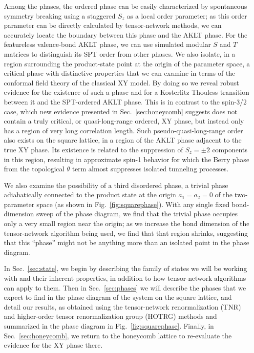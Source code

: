 \documentclass[aps,prb,letterpaper,superscriptaddress,twocolumn,showpacs,floatfix,10pt]{revtex4-1}
\begin{document}
Among the phases, the ordered phase can be easily characterized by spontaneous
symmetry breaking using a staggered $S_z$ as a local order parameter; as this
order parameter can be directly calculated by tensor-network methods,
we can accurately locate the boundary between this phase and the
AKLT phase. For the featureless valence-bond AKLT phase,
we can use simulated modular $S$ and $T$ matrices to distinguish its SPT order
from other phases.\cite{tnST,LevinGuSPT,HungWenSPT}
We also isolate, in a region surrounding the product-state
point at the origin of the parameter space, a critical phase with distinctive
properties that we can examine in terms of the conformal field theory of the
classical XY model.  By doing so we reveal
robust evidence for the existence of such a phase and for a Kosterlitz-Thouless
transition between it and the SPT-ordered AKLT phase. This is in contrast to
the spin-3/2 case\cite{AKLTspin32}, which new evidence
 presented in Sec.~\ref{sec:honeycomb}
suggests does not contain a truly critical, or quasi-long-range ordered,
XY phase, but instead only has a region of
very long correlation length. Such pseudo-quasi-long-range order also exists on
the square lattice, in a region of the AKLT phase adjacent to the
true XY phase.  Its existence is related to the suppression of $S_z=\pm 2$
components in this region, resulting in approximate spin-1
behavior for which the Berry
phase from the topological $\theta$ term almost suppresses isolated
tunneling processes.\cite{Haldane2D}

We  also examine the possibility of a third disordered phase, a trivial phase
adiabatically connected to the product state at the origin
$a_1=a_2=0$ of the two-parameter
space (as shown in  Fig.~\ref{fig:squarephase}). With any single fixed bond-dimension sweep of the phase diagram,
we find that the trivial phase occupies only a very small region near the
origin; as we increase the bond dimension of the tensor-network
algorithm being used, we find that that region shrinks,
suggesting that this ``phase'' might not be anything more than an
isolated point in the phase diagram.

In Sec.~\ref{sec:state}, we begin by describing the family of states we will
be working with and their inherent properties, in addition to how
tensor-network algorithms can apply to them.
Then in Sec.~\ref{sec:phases} we will describe the phases that
we expect to find in the phase diagram of the system on the square
lattice, and detail our results, as obtained
using the tensor-network renormalization (TNR) and higher-order tensor
renormalization group (HOTRG) methods and summarized in the phase
diagram in Fig.~\ref{fig:squarephase}.
Finally, in Sec.~\ref{sec:honeycomb}, we return to the honeycomb lattice
to re-evaluate the evidence for the XY phase there.
\end{document}
